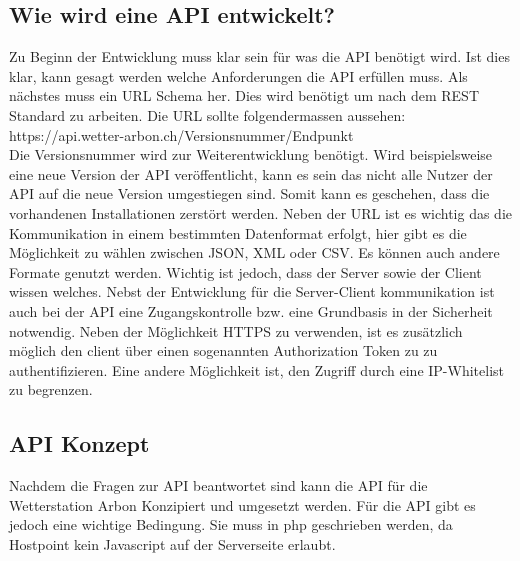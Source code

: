 \subsection{Wie wird eine API entwickelt?}
Zu Beginn der Entwicklung muss klar sein für was die API benötigt wird. Ist dies klar, kann gesagt werden welche Anforderungen die API erfüllen muss. Als nächstes muss ein URL Schema her. Dies wird benötigt um nach dem REST Standard zu arbeiten. Die URL sollte folgendermassen aussehen: \\ https://api.wetter-arbon.ch/Versionsnummer/Endpunkt\\
Die Versionsnummer wird zur Weiterentwicklung benötigt. Wird beispielsweise eine neue Version der API veröffentlicht, kann es sein das nicht alle Nutzer der API auf die neue Version umgestiegen sind. Somit kann es geschehen, dass die vorhandenen Installationen zerstört werden. Neben der URL ist es wichtig das die Kommunikation in einem bestimmten Datenformat erfolgt, hier gibt es die Möglichkeit zu wählen zwischen JSON, XML oder CSV. Es können auch andere Formate genutzt werden. Wichtig ist jedoch, dass der Server sowie der Client wissen welches. Nebst der Entwicklung für die Server-Client kommunikation ist auch bei der API eine Zugangskontrolle bzw. eine Grundbasis in der Sicherheit notwendig. Neben der Möglichkeit HTTPS zu verwenden, ist es zusätzlich möglich den client über einen sogenannten Authorization Token zu zu authentifizieren. Eine andere Möglichkeit ist, den Zugriff durch eine IP-Whitelist zu begrenzen. \\


\subsection{API Konzept}
Nachdem die Fragen zur API beantwortet sind kann die API für die Wetterstation Arbon Konzipiert und umgesetzt werden. Für die API gibt es jedoch eine wichtige Bedingung. Sie muss in php geschrieben werden, da Hostpoint kein Javascript auf der Serverseite erlaubt.

